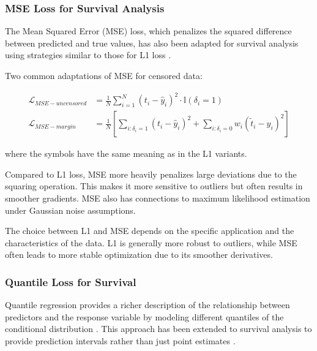 \subsubsection{MSE Loss for Survival Analysis}

The Mean Squared Error (MSE) loss, which penalizes the squared difference between predicted and true values, has also been adapted for survival analysis using strategies similar to those for L1 loss \parencite{biganzoli2001}.

\begin{definitionbox}[title=MSE Loss Variants for Survival]
  Two common adaptations of MSE for censored data:

  \begin{align}
    \mathcal{L}_{MSE-uncensored} &= \frac{1}{N} \sum_{i=1}^N (t_i - \hat{y}_i)^2 \cdot \mathbb{I}(\delta_i = 1) \\
    \mathcal{L}_{MSE-margin} &= \frac{1}{N} \left[ \sum_{i:\delta_i = 1} (t_i - \hat{y}_i)^2 + \sum_{i:\delta_i = 0} w_i (\tilde{t}_i - \hat{y}_i)^2 \right]
  \end{align}

  where the symbols have the same meaning as in the L1 variants.
\end{definitionbox}

Compared to L1 loss, MSE more heavily penalizes large deviations due to the squaring operation. This makes it more sensitive to outliers but often results in smoother gradients. MSE also has connections to maximum likelihood estimation under Gaussian noise assumptions.

The choice between L1 and MSE depends on the specific application and the characteristics of the data. L1 is generally more robust to outliers, while MSE often leads to more stable optimization due to its smoother derivatives.

\subsubsection{Quantile Loss for Survival}

Quantile regression provides a richer description of the relationship between predictors and the response variable by modeling different quantiles of the conditional distribution \parencite{koenker2001}. This approach has been extended to survival analysis to provide prediction intervals rather than just point estimates \parencite{tagasovska2019}.

